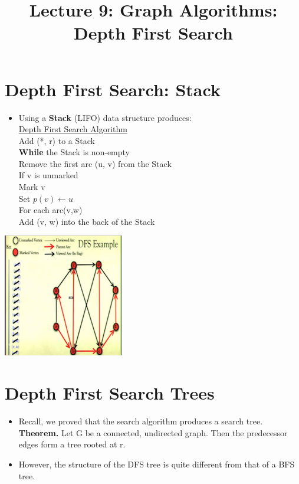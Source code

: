 \documentclass[12pt]{article}
\title{\huge Lecture 9: Graph Algorithms: Depth First Search}
\author{}
\date{}
\newcommand{\forceindent}{\leavevmode{\parindent=1em\indent}}
\begin{document}
\maketitle


\section{Depth First Search: Stack}
\renewcommand{\labelitemii}{$\circ$}
\renewcommand{\labelitemiii}{$\cdot$}
\renewcommand{\labelitemiii}{$\rightarrow$}
\renewcommand{\labelitemiv}{$\star$}
\begin{itemize}
\item Using a \textbf{Stack} (LIFO) data structure produces:\\
\underline{Depth First Search Algorithm}\\
Add (*, r) to a Stack\\
\forceindent \textbf{While} the Stack is non-empty\\
\forceindent \forceindent Remove the first arc (u, v) from the Stack\\
\forceindent \forceindent If v is unmarked \\
\forceindent \forceindent \forceindent Mark v\\
\forceindent \forceindent \forceindent Set $p(v) \leftarrow u$ \\ 
\forceindent \forceindent \forceindent For each arc(v,w)\\
\forceindent \forceindent \forceindent \forceindent Add (v, w) into the back of the Stack
\end{itemize}
\begin{center}
\includegraphics{lecture91}
\end{center}

\section{Depth First Search Trees}
\renewcommand{\labelitemii}{$\circ$}
\renewcommand{\labelitemiii}{$\cdot$}
\renewcommand{\labelitemiii}{$\rightarrow$}
\renewcommand{\labelitemiv}{$\star$}
\begin{itemize}
\item Recall, we proved that the search algorithm produces a search tree.\\
 \textbf{Theorem.} Let G be a connected, undirected graph. Then the predecessor edges form a tree rooted at r.
 \item However, the structure of the DFS tree is quite different from that of a BFS tree.
\end{itemize}
\end{document}
